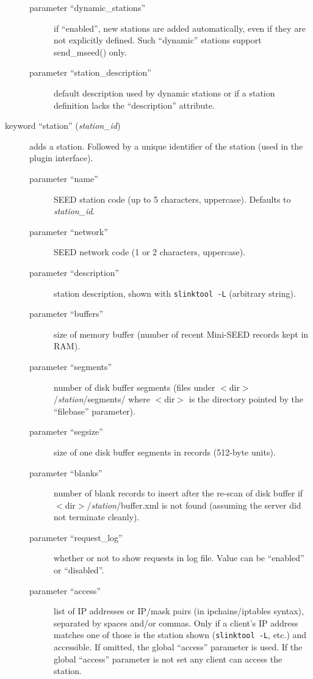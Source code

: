 \documentclass[11pt,a4paper,titlepage]{article}
\begin{document}
\begin{description}
\begin{description}
\item[parameter ``dynamic\_stations''] if ``enabled'', new stations are
added automatically, even if they are not explicitly defined. Such
``dynamic'' stations support send\_mseed() only.

\item[parameter ``station\_description''] default description used by
dynamic stations or if a station definition lacks the ``description''
attribute.
\end{description}

\item[keyword ``station'' (\textit{station\_id})] adds a station. Followed
by a unique identifier of the station (used in the plugin interface).

\begin{description}
\item[parameter ``name''] SEED station code (up to 5 characters,
uppercase). Defaults to \textit{station\_id}.

\item[parameter ``network''] SEED network code (1 or 2 characters,
uppercase).

\item[parameter ``description''] station description, shown with
\verb+slinktool -L+ (arbitrary string).

\item[parameter ``buffers''] size of memory buffer (number of recent
Mini-SEED records kept in RAM).

\item[parameter ``segments''] number of disk buffer segments (files under
$<$dir$>$/\textit{station}/segments/ where $<$dir$>$ is the directory
pointed by the ``filebase'' parameter).

\item[parameter ``segsize''] size of one disk buffer segments in records
(512-byte units).

\item[parameter ``blanks''] number of blank records to insert after the
re-scan of disk buffer if $<$dir$>$/\textit{station}/buffer.xml is not
found (assuming the server did not terminate cleanly).

\item[parameter ``request\_log''] whether or not to show requests in log
file. Value can be ``enabled'' or ``disabled''.

\item[parameter ``access''] list of IP addresses or IP/mask pairs (in
ipchains/iptables syntax), separated by spaces and/or commas. Only if
a client's IP address matches one of those is the station shown
(\verb+slinktool -L+, etc.) and accessible. If omitted, the global
``access'' parameter is used. If the global ``access'' parameter is
not set any client can access the station.


\end{description}
\end{description}
\end{document}
